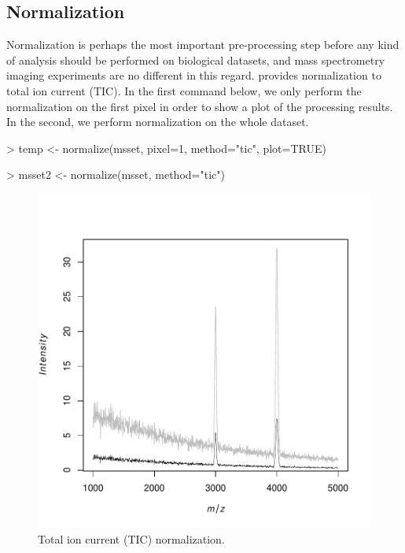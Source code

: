 \documentclass[a4paper]{article}
\begin{document}
\subsection{Normalization}

Normalization is perhaps the most important pre-processing step before any kind of analysis should be performed on biological datasets, and mass spectrometry imaging experiments are no different in this regard.  provides normalization to total ion current (TIC). In the first command below, we only perform the normalization on the first pixel in order to show a plot of the processing results. In the second, we perform normalization on the whole dataset.
\begin{Schunk}
\begin{Sinput}
> temp <- normalize(msset, pixel=1, method="tic", plot=TRUE)
\end{Sinput}
\end{Schunk}
\begin{Schunk}
\begin{Sinput}
> msset2 <- normalize(msset, method="tic")
\end{Sinput}
\end{Schunk}
\begin{figure}
\begin{center}
\includegraphics{Cardinal-demo-039}
\caption{\small Total ion current (TIC) normalization.}
\end{center}
\end{figure}
\end{document}
